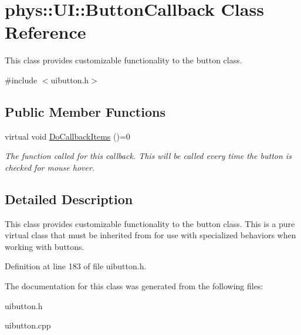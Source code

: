 \hypertarget{classphys_1_1UI_1_1ButtonCallback}{
\section{phys::UI::ButtonCallback Class Reference}
\label{df/dcb/classphys_1_1UI_1_1ButtonCallback}
}


This class provides customizable functionality to the button class.  




{\ttfamily \#include $<$uibutton.h$>$}

\subsection*{Public Member Functions}
\begin{DoxyCompactItemize}
\item 
\hypertarget{classphys_1_1UI_1_1ButtonCallback_a34e416ce289a5a786b59ccbd44f5dfda}{
virtual void \hyperlink{classphys_1_1UI_1_1ButtonCallback_a34e416ce289a5a786b59ccbd44f5dfda}{DoCallbackItems} ()=0}
\label{df/dcb/classphys_1_1UI_1_1ButtonCallback_a34e416ce289a5a786b59ccbd44f5dfda}

\begin{DoxyCompactList}\small\item\em The function called for this callback. This will be called every time the button is checked for mouse hover. \item\end{DoxyCompactList}\end{DoxyCompactItemize}


\subsection{Detailed Description}
This class provides customizable functionality to the button class. This is a pure virtual class that must be inherited from for use with specialized behaviors when working with buttons. 

Definition at line 183 of file uibutton.h.



The documentation for this class was generated from the following files:\begin{DoxyCompactItemize}
\item 
uibutton.h\item 
uibutton.cpp\end{DoxyCompactItemize}

